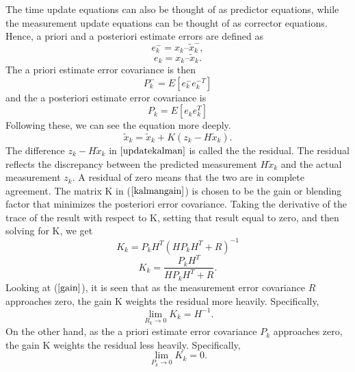 \documentclass[a4paper,10pt]{report}
\begin{document}
The time update equations can also be thought of as predictor equations, while the measurement update equations can be thought of as corrector equations.
\newline
Hence, a priori and a posteriori estimate errors are defined as
\begin{equation}
e_k^- = x_k – \tilde x_k^- ,
\end{equation}
\begin{equation}
e_k =  x_k – \tilde x_k.
\end{equation}
The a priori estimate error covariance is then
\begin{equation}
P_k^- = E[ e_k^- e_k^{-T} ]
\end{equation}
and the a posteriori estimate error covariance is
\begin{equation}
P_k = E[e_k e_k^T]
\end{equation}
Following these, we can see the equation more deeply.
\begin{equation}
\tilde x_k = \tilde x_k + K(z_k-H\tilde x_k).
\label{updatekalman}
\end{equation}
The difference $z_k - H\tilde x_k$ in $\ref{updatekalman}$ is called the the residual. The residual reflects the discrepancy between the
predicted measurement $H\tilde x_k$ and the actual measurement $z_k$. A residual of zero means that the two are in complete
agreement. \newline
The matrix K in ($\ref{kalmangain}$) is chosen to be the gain or blending factor that minimizes the posteriori error covariance. Taking the derivative of the trace of the result with respect to K, setting that result equal to zero, and then solving for K, we get
\begin{equation}
K_k = P_kH^{T}(HP_kH^{T} + R)^{-1}
\end{equation}
\begin{equation}
K_k = \frac{P_kH^T}{HP_kH^T + R}.
\label{gain}
\end{equation}
Looking at ($\ref{gain}$), it is seen that as the measurement error covariance $R$ approaches zero, the gain K weights the residual more
heavily. Specifically,
\begin{equation}
\mathop {\lim }\limits_{R_k \to 0 } {K_k} = H^{-1}.
\end{equation}
On the other hand, as the a priori estimate error covariance $P_k$ approaches zero, the gain K weights the residual less heavily. Specifically,
\begin{equation}
\mathop {\lim }\limits_{P_k \to 0 } {K_k} = 0.
\end{equation}
\end{document}
